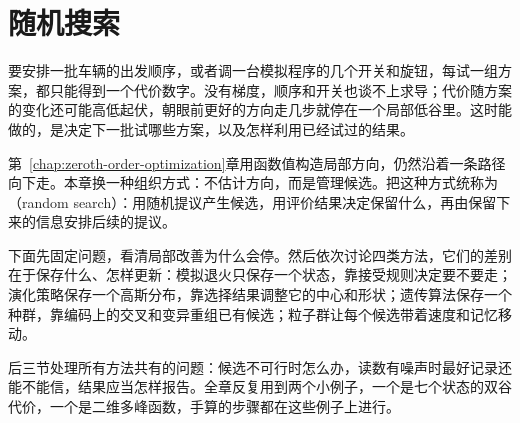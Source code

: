 \chapter{随机搜索}
\label{chap:random-search}

要安排一批车辆的出发顺序，或者调一台模拟程序的几个开关和旋钮，每试一组方案，都只能得到一个代价数字。没有梯度，顺序和开关也谈不上求导；代价随方案的变化还可能高低起伏，朝眼前更好的方向走几步就停在一个局部低谷里。这时能做的，是决定下一批试哪些方案，以及怎样利用已经试过的结果。

第~\ref{chap:zeroth-order-optimization}章用函数值构造局部方向，仍然沿着一条路径向下走。本章换一种组织方式：不估计方向，而是管理候选。把这种方式统称为（random search）：用随机提议产生候选，用评价结果决定保留什么，再由保留下来的信息安排后续的提议。

下面先固定问题，看清局部改善为什么会停。然后依次讨论四类方法，它们的差别在于保存什么、怎样更新：模拟退火只保存一个状态，靠接受规则决定要不要走；演化策略保存一个高斯分布，靠选择结果调整它的中心和形状；遗传算法保存一个种群，靠编码上的交叉和变异重组已有候选；粒子群让每个候选带着速度和记忆移动。

后三节处理所有方法共有的问题：候选不可行时怎么办，读数有噪声时最好记录还能不能信，结果应当怎样报告。全章反复用到两个小例子，一个是七个状态的双谷代价，一个是二维多峰函数，手算的步骤都在这些例子上进行。












